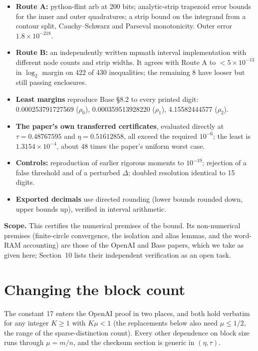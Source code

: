 \documentclass[11pt]{article}
\theoremstyle{plain}
\begin{document}
\begin{itemize}
\item \textbf{Route A:} python-flint arb at 200 bits; analytic-strip trapezoid error bounds~\cite[Thm.~3.2]{tw} for the inner and outer quadratures; a strip bound on the integrand from a contour split, Cauchy--Schwarz and Parseval monotonicity. Outer error $1.8\times10^{-218}$.
\item \textbf{Route B:} an independently written mpmath interval implementation with different node counts and strip widths. It agrees with Route A to $< 5\times10^{-13}$ in $\log_2$ margin on 422 of 430 inequalities; the remaining 8 have looser but still passing enclosures.
\item \textbf{Least margins} reproduce Base \S8.2 to every printed digit: 0.000253791727569 ($\rho_0$), 0.000359513928220 ($\rho_1$), 4.15582444577 ($\rho_2$).
\item \textbf{The paper's own transferred certificates}, evaluated directly at $\tau = 0.48767595$ and $\eta = 0.51612858$, all exceed the required $10^{-6}$; the least is $1.3154\times10^{-4}$, about 48 times the paper's uniform worst case.
\item \textbf{Controls:} reproduction of earlier rigorous moments to $10^{-19}$; rejection of a false threshold and of a perturbed $\Delta$; doubled resolution identical to 15 digits.
\item \textbf{Exported decimals} use directed rounding (lower bounds rounded down, upper bounds up), verified in interval arithmetic.
\end{itemize}

\textbf{Scope.} This certifies the numerical premises of the bound. Its non-numerical premises (finite-circle convergence, the isolation and alias lemmas, and the word-RAM accounting) are those of the OpenAI and Base papers, which we take as given here; Section~10 lists their independent verification as an open task.

\section{Changing the block count}

The constant 17 enters the OpenAI proof in two places, and both hold verbatim for any integer $K \ge 1$ with $K\mu < 1$ (the replacements below also need $\mu \le 1/2$, the range of the sparse-distinction count). Every other dependence on block size runs through $\mu = m/n$, and the checksum section is generic in $(\eta, \tau)$.
\end{document}
